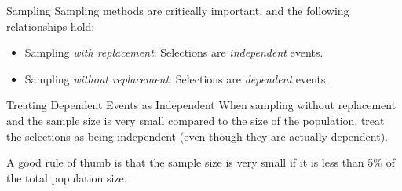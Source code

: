 \documentclass{beamer}
\begin{document}
\begin{frame}
\begin{block}{Sampling}
Sampling methods are critically important, and the following relationships hold:
\begin{itemize}
\item Sampling \emph{with replacement}: Selections are \emph{independent} events.
\item Sampling \emph{without replacement}: Selections are \emph{dependent} events.
\end{itemize}
\end{block}\pause

\begin{block}{Treating Dependent Events as Independent}
When sampling without replacement and the sample size is very small compared to the size of the population, treat the selections as being independent (even though they are actually dependent).
\end{block}\pause

\begin{note}
A good rule of thumb is that the sample size is very small if it is less than 5\% of the total population size.
\end{note}
\end{frame}
\end{document}
